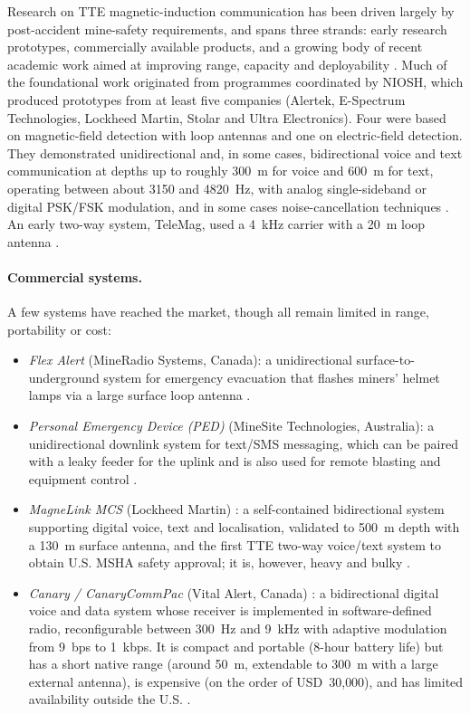 Research on TTE magnetic-induction communication has been driven largely by
post-accident mine-safety requirements, and spans three strands: early research
prototypes, commercially available products, and a growing body of recent
academic work aimed at improving range, capacity and
deployability \cite{ngwenyama2024, ma2025survey}.
\newp
Much of the foundational work originated from
programmes coordinated by NIOSH, which produced prototypes from at least five
companies (Alertek, E-Spectrum Technologies, Lockheed Martin, Stolar and Ultra
Electronics). Four were based on magnetic-field detection with loop antennas and
one on electric-field detection. They demonstrated unidirectional and, in some
cases, bidirectional voice and text communication at depths up to roughly 300~m
for voice and 600~m for text, operating between about 3150 and 4820~Hz, with
analog single-sideband or digital PSK/FSK modulation, and in some cases
noise-cancellation techniques \cite{carreno2016through}. An early two-way system,
TeleMag, used a 4~kHz carrier with a 20~m loop antenna \cite{bae2013}.

\paragraph{Commercial systems.} A few systems have reached the market, though all
remain limited in range, portability or cost:
\begin{itemize}
  \item \emph{Flex Alert} (MineRadio Systems, Canada): a unidirectional
        surface-to-underground system for emergency evacuation that flashes
        miners' helmet lamps via a large surface loop antenna \cite{carreno2016through}.
  \item \emph{Personal Emergency Device (PED)} (MineSite Technologies, Australia):
        a unidirectional downlink system for text/SMS messaging, which can be
        paired with a leaky feeder for the uplink and is also used for remote
        blasting and equipment control \cite{carreno2016through}.
  \item \emph{MagneLink MCS} (Lockheed Martin) \cite{teslasociety}: a self-contained bidirectional
        system supporting digital voice, text and localisation, validated to
        500~m depth with a 130~m surface antenna, and the first TTE two-way
        voice/text system to obtain U.S. MSHA safety approval; it is, however,
        heavy and bulky \cite{carreno2016through, ngwenyama2024}.
  \item \emph{Canary / CanaryCommPac} (Vital Alert, Canada) \cite{vitalalert}: a bidirectional
        digital voice and data system whose receiver is implemented in
        software-defined radio, reconfigurable between 300~Hz and 9~kHz with
        adaptive modulation from 9~bps to 1~kbps. It is compact and portable
        (8-hour battery life) but has a short native range (around 50~m,
        extendable to 300~m with a large external antenna), is expensive (on the
        order of USD~30{,}000), and has limited availability outside the
        U.S. \cite{carreno2016through}.
\end{itemize}

